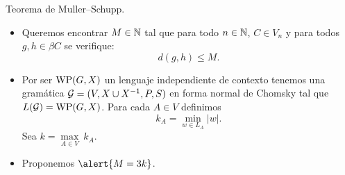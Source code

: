 \documentclass[aspectratio=169, 10pt]{beamer}
\begin{document}
	\begin{frame}[fragile]{Teorema de Muller--Schupp.}
		\begin{itemize}
			\item Queremos encontrar $M \in \mathbb{N}$ tal que para todo $n \in \mathbb{N}$, $C \in V_{n}$
			y para todos $g,h \in \beta C$ se verifique:
			\[
				d(g,h) \le M.
			\]
			\pause 
			\item Por ser $\text{WP}(G, X)$ un lenguaje independiente de contexto tenemos una gramática ${\cal G} = (V,X \cup X^{-1}, P, S)$ en forma normal de Chomsky 
			tal que $L({\cal G}) = \text{WP}(G, X)$.
			\pause 
			Para cada $A \in V$ definimos 
			\[
				k_{A} = \underset{w \in L_{A}}{\min} |w|.
			\]
			\pause 
			Sea $k = \underset{A \in V}{\max} \ k_{A}$.
			\pause 
			\item Proponemos $\alert{M = 3k}$.
		\end{itemize}
	\end{frame}
\end{document}
